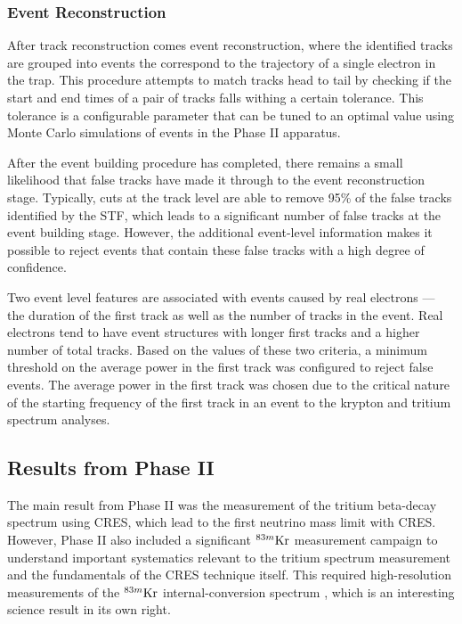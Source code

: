 \subsubsection*{Event Reconstruction}

After track reconstruction comes event reconstruction, where the identified tracks are grouped into events the correspond to the trajectory of a single electron in the trap. This procedure attempts to match tracks head to tail by checking if the start and end times of a pair of tracks falls withing a certain tolerance. This tolerance is a configurable parameter that can be tuned to an optimal value using Monte Carlo simulations of events in the Phase II apparatus.

After the event building procedure has completed, there remains a small likelihood that false tracks have made it through to the event reconstruction stage. Typically, cuts at the track level are able to remove 95\% of the false tracks identified by the STF, which leads to a significant number of false tracks at the event building stage. However, the additional event-level information makes it possible to reject events that contain these false tracks with a high degree of confidence. 

Two event level features are associated with events caused by real electrons --- the duration of the first track as well as the number of tracks in the event. Real electrons tend to have event structures with longer first tracks and a higher number of total tracks. Based on the values of these two criteria, a minimum threshold on the average power in the first track was configured to reject false events. The average power in the first track was chosen due to the critical nature of the starting frequency of the first track in an event to the krypton and tritium spectrum analyses.

\subsection{Results from Phase II}

The main result from Phase II was the measurement of the tritium beta-decay spectrum using CRES, which lead to the first neutrino mass limit with CRES. However, Phase II also included a significant $^{83m}\rm{Kr}$ measurement campaign to understand important systematics relevant to the tritium spectrum measurement and the fundamentals of the CRES technique itself. This required high-resolution measurements of the $^{83m}\rm{Kr}$ internal-conversion spectrum \cite{krypton83m}, which is an interesting science result in its own right.

